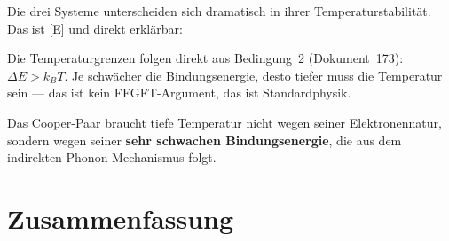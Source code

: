 Die drei Systeme unterscheiden sich dramatisch in ihrer
Temperaturstabilität. Das ist [E] und direkt erklärbar:

\begin{center}
\end{center}

\begin{keypoint}
Die Temperaturgrenzen folgen direkt aus Bedingung~2
(Dokument~173): $\Delta E > k_BT$.
Je schwächer die Bindungsenergie, desto tiefer muss
die Temperatur sein --- das ist kein FFGFT-Argument,
das ist Standardphysik.

Das Cooper-Paar braucht tiefe Temperatur nicht wegen
seiner Elektronennatur, sondern wegen seiner
\textbf{sehr schwachen Bindungsenergie},
die aus dem indirekten Phonon-Mechanismus folgt.
\end{keypoint}

\section{Zusammenfassung}
\label{sec:zusammenfassung-179}

